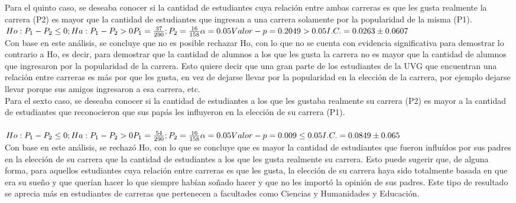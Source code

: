 Para el quinto caso, se deseaba conocer si la cantidad de estudiantes cuya relación entre ambas carreras es que les gusta realmente la carrera (P2) es mayor que la cantidad de estudiantes que ingresan a una carrera solamente por la popularidad de la misma (P1). \\

\begin{math}
	Ho: P_{1} - P_{2} \leq 0; 
	Ha: P_{1} - P_{2} > 0 \\
	P_{1} = \frac{37}{290}; P_{2} = \frac{16}{158} \\
	\alpha = 0.05\\
	Valor-p = 0.2049 > 0.05\\
	I.C.= 0.0263 \pm 0.0607\\
\end{math}
\\
Con base en este análisis, se concluye que no es posible rechazar Ho, con lo que no se cuenta con evidencia significativa para demostrar lo contrario a Ho, es decir, para demostrar que la cantidad de alumnos a los que les gusta la carrera no es mayor que la cantidad de alumnos que ingresaron por la popularidad de la carrera. Esto quiere decir que una gran parte de los estudiantes de la UVG que encuentran una relación entre carreras es más por que les gusta, en vez de dejarse llevar por la popularidad en la elección de la carrera, por ejemplo dejarse llevar porque sus amigos ingresaron a esa carrera, etc.\\

Para el sexto caso, se deseaba conocer si la cantidad de estudiantes a los que les gustaba realmente su carrera (P2) es mayor a la cantidad de estudiantes que reconocieron que sus papás les influyeron en la elección de su carrera (P1).\\
\\
\begin{math}
	Ho: P_{1} - P_{2} \leq 0; 
	Ha: P_{1} - P_{2} > 0 \\
	P_{1} = \frac{54}{290}; P_{2} = \frac{16}{158} \\
	\alpha = 0.05\\
	Valor-p = 0.009 \leq 0.05\\
	I.C.= 0.0849 \pm 0.065\\
\end{math}
\\
Con base en este análisis, se rechazó Ho, con lo que se concluye que es mayor la cantidad de estudiantes que fueron influídos por sus padres en la elección de su carrera que la cantidad de estudiantes a los que les gusta realmente su carrera. Esto puede sugerir que, de alguna forma, para aquellos estudiantes cuya relación entre carreras es que les gusta, la elección de su carrera haya sido totalmente basada en que era su sueño y que querían hacer lo que siempre habían soñado hacer y que no les importó la opinión de sus padres. Este tipo de resultado se aprecia más en estudiantes de carreras que pertenecen a facultades como Ciencias y Humanidades y Educación.


 